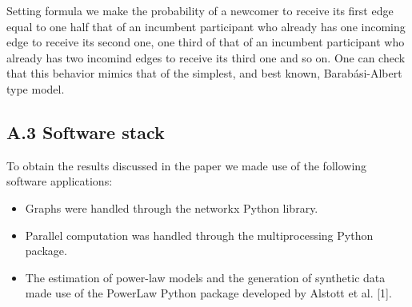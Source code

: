 Setting formula we make the probability of a newcomer to receive its first edge equal to one half that of an incumbent participant who already has one incoming edge to receive its second one, one third of that of an incumbent participant who already has two incomind edges to receive its third one and so on. One can check that this behavior mimics that of the simplest, and best known, Barabási-Albert type model. 

\subsection*{A.3 Software stack}

To obtain the results discussed in the paper we made use of the following software applications:
\begin{itemize}
\item Graphs were handled through the networkx Python library.
\item Parallel computation was handled through the multiprocessing Python package. 
\item The estimation of power-law models and the generation of synthetic data made use of the PowerLaw Python package developed by Alstott et al. [1].
\end{itemize}
